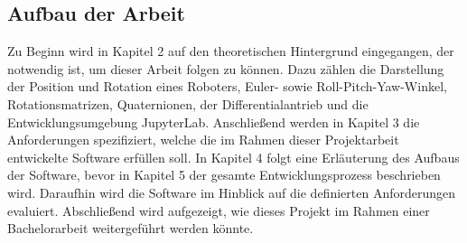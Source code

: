 \subsection{Aufbau der Arbeit}
Zu Beginn wird in Kapitel 2 auf den theoretischen Hintergrund eingegangen, der notwendig ist, um dieser Arbeit folgen zu können.
Dazu zählen die Darstellung der Position und Rotation eines Roboters, Euler- sowie Roll-Pitch-Yaw-Winkel, Rotationsmatrizen, Quaternionen,
der Differentialantrieb und die Entwicklungsumgebung JupyterLab.
Anschließend werden in Kapitel 3 die Anforderungen spezifiziert, welche die im Rahmen dieser Projektarbeit entwickelte Software erfüllen soll.
In Kapitel 4 folgt eine Erläuterung des Aufbaus der Software, bevor in Kapitel 5 der gesamte Entwicklungsprozess beschrieben wird.
Daraufhin wird die Software im Hinblick auf die definierten Anforderungen evaluiert.
Abschließend wird aufgezeigt, wie dieses Projekt im Rahmen einer Bachelorarbeit weitergeführt werden könnte.